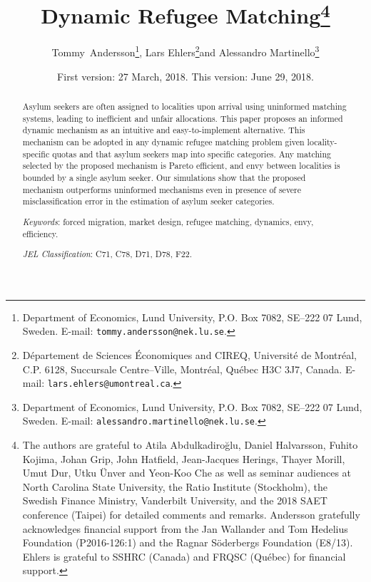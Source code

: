 \documentclass[12pt,fleqn]{article}
\begin{document}
\title{\textbf{Dynamic Refugee Matching}\footnote{The authors are grateful to Atila Abdulkadiro\u{g}lu, Daniel Halvarsson, Fuhito Kojima, Johan Grip, John Hatfield, Jean-Jacques Herings, Thayer Morill, Umut Dur, Utku \"{U}nver and Yeon-Koo Che as well as seminar audiences at North Carolina State University, the Ratio Institute (Stockholm), the Swedish Finance Ministry, Vanderbilt University, and the 2018 SAET conference (Taipei) for detailed comments and remarks. Andersson gratefully acknowledges financial support from the Jan Wallander and Tom Hedelius Foundation (P2016-126:1) and the Ragnar S\"oderbergs Foundation (E8/13). Ehlers is grateful to SSHRC (Canada) and FRQSC (Qu\'{e}bec) for financial support.}}

\author{Tommy~Andersson\footnote{Department of Economics, Lund University, P.O. Box 7082, SE--222 07 Lund, Sweden. E-mail: \texttt{tommy.andersson@nek.lu.se}.}, Lars Ehlers\footnote{D\'epartement de Sciences \'Economiques and CIREQ, Universit\'e de Montr\'eal, C.P. 6128, Succursale Centre--Ville, Montr\'eal, Qu\'ebec H3C
3J7, Canada. E-mail: \texttt{lars.ehlers@umontreal.ca}.}\space\space and Alessandro Martinello\footnote{Department of Economics, Lund University, P.O. Box 7082, SE--222 07 Lund, Sweden. E-mail: \texttt{alessandro.martinello@nek.lu.se}.}}

\date{\small{First version: 27 March, 2018. This version: June 29, 2018.}}

\maketitle
\vspace*{-4mm}
\begin{abstract}
\noindent Asylum seekers are often assigned to localities upon arrival using uninformed matching systems, leading to inefficient and unfair allocations. This paper proposes an informed dynamic mechanism as an intuitive and easy-to-implement alternative. This mechanism can be adopted in any dynamic refugee matching problem given locality-specific quotas and that asylum seekers map into specific categories. Any matching selected by the proposed mechanism is Pareto efficient, and envy between localities is bounded by a single asylum seeker. Our simulations show that the proposed mechanism outperforms uninformed mechanisms even in presence of severe misclassification error in the estimation of asylum seeker categories.

\medskip

\noindent\emph{Keywords}: forced migration, market design, refugee matching, dynamics, envy, efficiency.

\medskip

\noindent\emph{JEL Classification}: C71, C78, D71, D78, F22.

\end{abstract}
\end{document}
